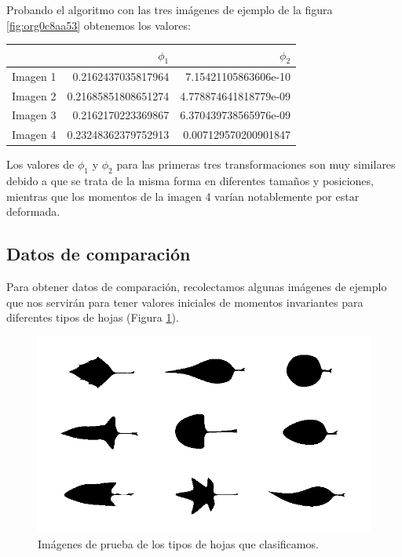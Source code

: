 \documentclass[letter]{article}
\begin{document}
Probando el algoritmo con las tres imágenes de ejemplo de la figura \ref{fig:org0c8aa53} obtenemos
los valores:

\begin{center}
\begin{tabular}{lrr}
 & \(\phi_1\) & \(\phi_2\)\\
\hline
Imagen 1 & 0.2162437035817964 & 7.15421105863606e-10\\
Imagen 2 & 0.21685851808651274 & 4.778874641818779e-09\\
Imagen 3 & 0.2162170223369867 & 6.370439738565976e-09\\
Imagen 4 & 0.23248362379752913 & 0.007129570200901847\\
\end{tabular}
\end{center}

Los valores de \(\phi_1\) y \(\phi_2\) para las primeras tres transformaciones son
muy similares debido a que se trata de la misma forma en diferentes tamaños y
posiciones, mientras que los momentos de la imagen 4 varían notablemente por
estar deformada.

\subsection{Datos de comparación}
\label{sec:orge79c667}
Para obtener datos de comparación, recolectamos algunas imágenes de ejemplo que
nos servirán para tener valores iniciales de momentos invariantes para
diferentes tipos de hojas (Figura \ref{fig:org003df6a}).

\begin{figure}[htbp]
\centering
\includegraphics[width=.9\linewidth]{./images/leaves.png}
\caption{\label{fig:org003df6a}Imágenes de prueba de los tipos de hojas que clasificamos.}
\end{figure}
\end{document}
